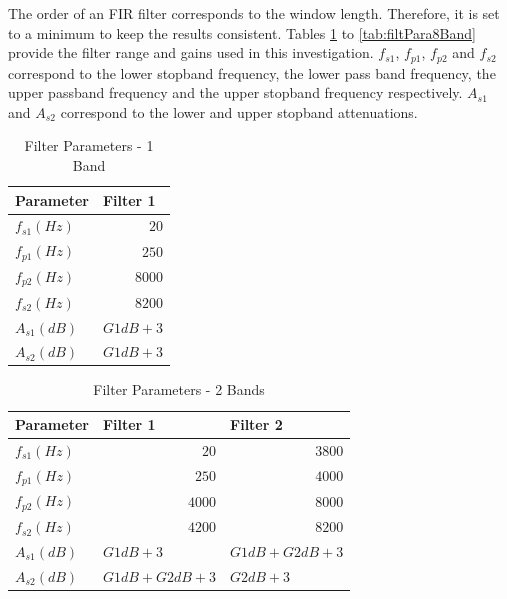 \documentclass[11pt,onecolumn]{witseiepaper}
\begin{document}
\begin{appendices}
\noindent The order of an FIR filter corresponds to the window length. Therefore, it is set to a minimum to keep the results consistent. Tables \ref{tab:filtPara1Band} to \ref{tab:filtPara8Band} provide the filter range and gains used in this investigation. $f_{s1}$, $f_{p1}$, $f_{p2}$ and $f_{s2}$ correspond to the lower stopband frequency, the lower pass band frequency, the upper passband frequency and the upper stopband frequency respectively. $A_{s1}$ and $A_{s2}$ correspond to the lower and upper stopband attenuations.

\begin{table}[htbp]
  \centering
  \caption{Filter Parameters - 1 Band}
    \begin{tabular}{|l|l|}
    \hline
    \textbf{Parameter} & \textbf{Filter 1} \\
    \hline
    $f_{s1} (Hz)$   & \multicolumn{1}{r|}{$20$} \\
    \hline
    $f_{p1} (Hz)$   & \multicolumn{1}{r|}{$250$} \\
    \hline
    $f_{p2} (Hz)$   & \multicolumn{1}{r|}{$8000$} \\
    \hline
    $f_{s2} (Hz)$   & \multicolumn{1}{r|}{$8200$} \\
    \hline
    $A_{s1} (dB)$   & $G1dB + 3$ \\
    \hline
    $A_{s2} (dB)$   & $G1dB + 3$ \\
    \hline
    \end{tabular}%
  \label{tab:filtPara1Band}%
\end{table}%


\begin{table}[htbp]
  \centering
  \caption{Filter Parameters - 2 Bands}
    \begin{tabular}{|l|l|l|}
    \hline
    \textbf{Parameter} & \textbf{Filter 1} & \textbf{Filter 2} \\
    \hline
    $f_{s1} (Hz)$   & \multicolumn{1}{r|}{$20$} & \multicolumn{1}{r|}{$ 3800$ } \\
    \hline
    $f_{p1} (Hz)$  & \multicolumn{1}{r|}{$250$} & \multicolumn{1}{r|}{$4000$} \\
    \hline
    $f_{p2} (Hz)$   & \multicolumn{1}{r|}{$ 4000$ } & \multicolumn{1}{r|}{$8000$} \\
    \hline
    $f_{s2} (Hz)$   & \multicolumn{1}{r|}{$ 4200$ } & \multicolumn{1}{r|}{$8200$} \\
    \hline
    $A_{s1} (dB)$   & $G1dB + 3$ & $G1dB + G2dB + 3$ \\
    \hline
    $A_{s2} (dB)$   & $G1dB + G2dB + 3$ & $G2dB + 3$ \\
    \hline
    \end{tabular}%
  \label{tab:filtPara2Band}%
\end{table}%


\end{appendices}
\end{document}
